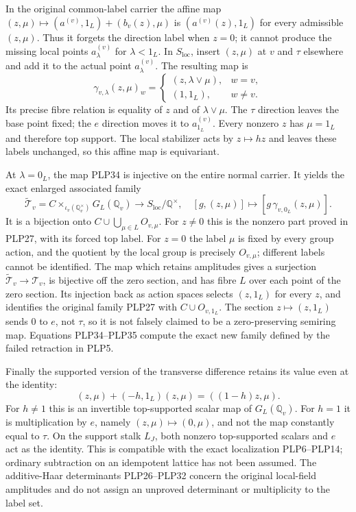 In the original common-label carrier the affine map
$(z,\mu)\mapsto(a^{(v)},1_L)+(b_v(z),\mu)$ is
$(a^{(v)}(z),1_L)$ for every admissible $(z,\mu)$.
Thus it forgets the direction label when $z=0$; it cannot produce
the missing local points $a^{(v)}_\lambda$ for $\lambda<1_L$.
In $S_{\mathrm{loc}}$, insert $(z,\mu)$ at $v$ and $\tau$
elsewhere and add it to the actual point $a^{(v)}_\lambda$.
The resulting map is
\begin{equation}\tag{PLP34}
\gamma_{v,\lambda}(z,\mu)_w=
\begin{cases}
(z,\lambda\vee\mu),&w=v,\\
(1,1_L),&w\ne v.
\end{cases}
\end{equation}
Its precise fibre relation is equality of $z$ and of
$\lambda\vee\mu$. The $\tau$ direction leaves the base point
fixed; the $e$ direction moves it to $a^{(v)}_{1_L}$.
Every nonzero $z$ has $\mu=1_L$ and therefore top support.
The local stabilizer acts by $z\mapsto hz$ and leaves these
labels unchanged, so this affine map is equivariant.

At $\lambda=0_L$, the map PLP34 is injective on the entire
normal carrier. It yields the exact enlarged associated family
\begin{equation}\tag{PLP35}
\widetilde{\mathcal T}_v=
C\times_{\iota_v(\mathbb Q_v^\times)}G_L(\mathbb Q_v)
\longrightarrow S_{\mathrm{loc}}/\mathbb Q^\times,
\quad
[g,(z,\mu)]\longmapsto[g\,\gamma_{v,0_L}(z,\mu)].
\end{equation}
It is a bijection onto $C\cup\bigcup_{\mu\in L}O_{v,\mu}$.
For $z\ne0$ this is the nonzero part proved in PLP27, with its
forced top label. For $z=0$ the label $\mu$ is fixed by every
group action, and the quotient by the local group is precisely
$O_{v,\mu}$; different labels cannot be identified. The map
which retains amplitudes gives a surjection
$\widetilde{\mathcal T}_v\to\mathcal T_v$, is bijective off
the zero section, and has fibre $L$ over each point of the zero
section. Its injection back as action spaces selects
$(z,1_L)$ for every $z$, and identifies the original family
PLP27 with $C\cup O_{v,1_L}$. The section $z\mapsto(z,1_L)$
sends $0$ to $e$, not $\tau$, so it is not falsely claimed to
be a zero-preserving semiring map. Equations PLP34--PLP35
compute the exact new family defined by the failed retraction
in PLP5.

Finally the supported version of the transverse difference
retains its value even at the identity:
\begin{equation}\tag{PLP36}
(z,\mu)+(-h,1_L)(z,\mu)=((1-h)z,\mu).
\end{equation}
For $h\ne1$ this is an invertible top-supported scalar map of
$G_L(\mathbb Q_v)$. For $h=1$ it is multiplication by $e$,
namely $(z,\mu)\mapsto(0,\mu)$, and not the map constantly
equal to $\tau$. On the support stalk $L_J$, both nonzero
top-supported scalars and $e$ act as the identity. This is
compatible with the exact localization PLP6--PLP14; ordinary
subtraction on an idempotent lattice has not been assumed.
The additive-Haar determinants PLP26--PLP32 concern the
original local-field amplitudes and do not assign an
unproved determinant or multiplicity to the label set.

